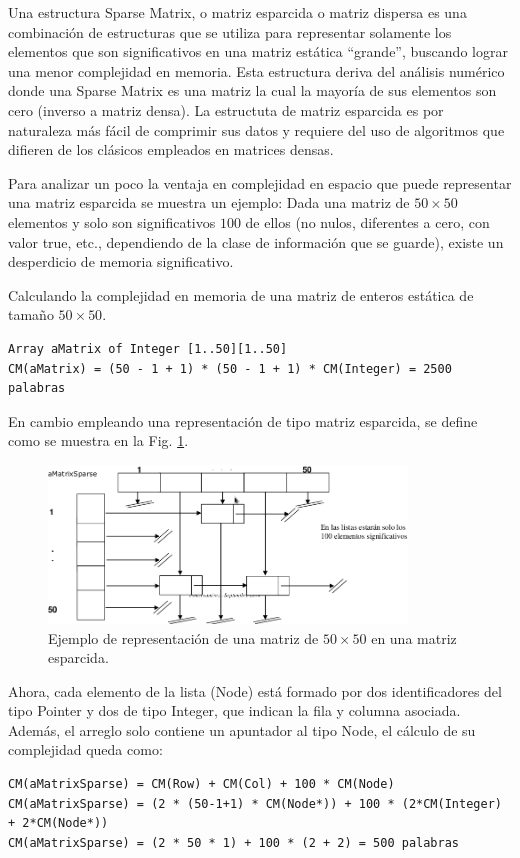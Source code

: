 Una estructura Sparse Matrix, o matriz esparcida o matriz dispersa es una combinación de estructuras que se utiliza para representar solamente los elementos que son significativos en una matriz estática “grande”, buscando lograr una menor complejidad en memoria. Esta estructura deriva del análisis numérico donde una Sparse Matrix es una matriz la cual la mayoría de sus elementos son cero (inverso a matriz densa). La estructuta de matriz esparcida es por naturaleza más fácil de comprimir sus datos y requiere del uso de algoritmos que difieren de los clásicos empleados en matrices densas.

Para analizar un poco la ventaja en complejidad en espacio que puede representar una matriz esparcida se muestra un ejemplo: Dada una matriz de $50 \times 50$ elementos y solo son significativos $100$ de ellos (no nulos, diferentes a cero, con valor true, etc., dependiendo de la clase de información que se guarde), existe un desperdicio de memoria significativo.

Calculando la complejidad en memoria de una matriz de enteros estática de tamaño $50 \times 50$.
\begin{lstlisting}[upquote=true, language=pseudo]
Array aMatrix of Integer [1..50][1..50]
CM(aMatrix) = (50 - 1 + 1) * (50 - 1 + 1) * CM(Integer) = 2500 palabras
\end{lstlisting}

En cambio empleando una representación de tipo matriz esparcida, se define como se muestra en la Fig. \ref{fig:sparse}.

\begin{figure}[htp!]
  \begin{center}
    \includegraphics[width=0.85\textwidth]{images/sparse.png}
  \end{center}
  \caption{Ejemplo de representación de una matriz de $50 \times 50$ en una matriz esparcida.}
  \label{fig:sparse}
\end{figure}

Ahora, cada elemento de la lista (Node) está formado por dos identificadores del tipo Pointer y dos de tipo Integer, que indican la fila y columna asociada. Además, el arreglo solo contiene un apuntador al tipo Node, el cálculo de su complejidad queda como:
\begin{lstlisting}[upquote=true, language=pseudo]
CM(aMatrixSparse) = CM(Row) + CM(Col) + 100 * CM(Node)
CM(aMatrixSparse) = (2 * (50-1+1) * CM(Node*)) + 100 * (2*CM(Integer) + 2*CM(Node*))
CM(aMatrixSparse) = (2 * 50 * 1) + 100 * (2 + 2) = 500 palabras
\end{lstlisting}


